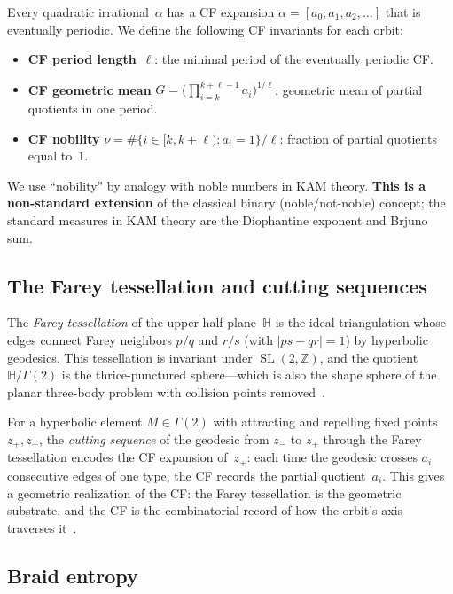 \documentclass[11pt]{article}
\theoremstyle{definition}
\newcommand{\Z}{\mathbb{Z}}
\newcommand{\HH}{\mathbb{H}}
\DeclareMathOperator{\SL}{SL}
\begin{document}
Every quadratic irrational~$\alpha$ has a CF expansion
$\alpha = [a_0; a_1, a_2, \ldots]$ that is eventually periodic.
We define the following CF invariants for each orbit:
\begin{itemize}
\item \textbf{CF period length}~$\ell$: the minimal period of the
  eventually periodic CF.
\item \textbf{CF geometric mean}
  $G = \bigl(\prod_{i=k}^{k+\ell-1} a_i\bigr)^{1/\ell}$:
  geometric mean of partial quotients in one period.
\item \textbf{CF nobility}
  $\nu = \#\{i \in [k, k+\ell): a_i = 1\} / \ell$:
  fraction of partial quotients equal to~$1$.
\end{itemize}

We use ``nobility'' by analogy with noble numbers in KAM theory.
\textbf{This is a non-standard extension} of the classical binary
(noble/not-noble) concept; the standard measures in KAM theory are
the Diophantine exponent and Brjuno sum.

\subsection{The Farey tessellation and cutting sequences}

The \emph{Farey tessellation} of the upper half-plane~$\HH$ is the
ideal triangulation whose edges connect Farey neighbors $p/q$ and
$r/s$ (with $|ps - qr| = 1$) by hyperbolic geodesics.  This
tessellation is invariant under $\SL(2,\Z)$, and the quotient
$\HH/\Gamma(2)$ is the thrice-punctured sphere---which is also the
shape sphere of the planar three-body problem with collision points
removed~\cite{Montgomery1998}.

For a hyperbolic element $M \in \Gamma(2)$ with attracting and
repelling fixed points $z_+, z_-$, the \emph{cutting sequence} of the
geodesic from $z_-$ to $z_+$ through the Farey tessellation encodes
the CF expansion of~$z_+$: each time the geodesic crosses $a_i$
consecutive edges of one type, the CF records the partial
quotient~$a_i$.  This gives a geometric realization of the CF: the
Farey tessellation is the geometric substrate, and the CF is the
combinatorial record of how the orbit's axis traverses
it~\cite{Series1985}.

\subsection{Braid entropy}
\end{document}
